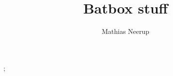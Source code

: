 \documentclass[10pt,a4paper]{memoir}
\author{Mathias Neerup}
\title{Batbox stuff}
\begin{document}
\maketitle
\tableofcontents

\frontmatter









\mainmatter
;






\listoftodos
\end{document}
